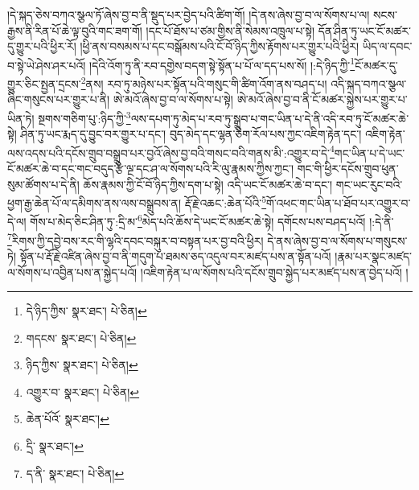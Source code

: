 །དེ་སྐད་ཅེས་བཀའ་སྩལ་ཏོ་ཞེས་བྱ་བ་ནི་སྡུད་པར་བྱེད་པའི་ཚིག་གོ། །དེ་ནས་ཞེས་བྱ་བ་ལ་སོགས་པ་ལ། སངས་རྒྱས་ནི་རིན་པོ་ཆེ་ལྟ་བུའི་གང་ཟག་གོ། །དང་པོ་ཐོས་པ་ཙམ་གྱིས་ནི་སེམས་འཁྲུལ་པ་སྟེ། དོན་ཤིན་ཏུ་ཡང་ངོ་མཚར་དུ་གྱུར་པའི་ཕྱིར་རོ། །ཕྱི་ནས་བསམས་པ་དང་བསྒོམས་པའི་ངོ་བོ་ཉིད་ཀྱིས་རྟོགས་པར་གྱུར་པའི་ཕྱིར། ཡིད་ལ་དབང་བ་སྟེ་ཡེ་ཤེས་ཤར་པའོ། །དེའི་འོག་ཏུ་ནི་རབ་དགྱེས་བདག་སྟེ་སྟོན་པ་པོ་ལ་དད་པས་སོ། །:དེ་ཉིད་ཀྱི་\footnote{དེ་ཉིད་ཀྱིས་  སྣར་ཐང་།  པེ་ཅིན། }ངོ་མཚར་དུ་གྱུར་ཅིང་སྤྱན་དྲངས་\footnote{གདངས་  སྣར་ཐང་།  པེ་ཅིན། }ནས། རབ་ཏུ་མཉེས་པར་སྟོན་པའི་གསུང་གི་ཚིག་འོག་ནས་བཤད་པ། འདི་སྐད་བཀའ་སྩལ་ཞིང་གསུངས་པར་གྱུར་པ་ནི། ཨེ་མའོ་ཞེས་བྱ་བ་ལ་སོགས་པ་སྟེ། ཨེ་མའོ་ཞེས་བྱ་བ་ནི་ངོ་མཚར་སྐྱེས་པར་གྱུར་པ་ཡིན་ཏེ། སྔགས་གཅིག་པུ་:ཉིད་ཀྱི་\footnote{ཉིད་ཀྱིས་  སྣར་ཐང་།  པེ་ཅིན། }ལས་དཔག་ཏུ་མེད་པ་རབ་ཏུ་སྒྲུབ་པ་གང་ཡིན་པ་དེ་ནི་འདི་རབ་ཏུ་ངོ་མཚར་ཆེ་སྟེ། ཤིན་ཏུ་ཡང་རྨད་དུ་བྱུང་བར་གྱུར་པ་དང་། བུད་མེད་དང་ལྷན་ཅིག་རོལ་པས་ཀྱང་འཇིག་རྟེན་དང་། འཇིག་རྟེན་ལས་འདས་པའི་དངོས་གྲུབ་བསྒྲུབ་པར་བྱའོ་ཞེས་བྱ་བའི་གསང་བའི་གནས་མི་:འགྱུར་བ་དེ་\footnote{འགྱུར་བ་  སྣར་ཐང་།  པེ་ཅིན། }གང་ཡིན་པ་དེ་ཡང་ངོ་མཚར་ཆེ་བ་དང་གང་བདུད་རྩི་ལྔ་དང་ཤ་ལ་སོགས་པའི་རི་ལུ་རྣམས་ཀྱིས་ཀྱང་། གང་གི་ཕྱིར་དངོས་གྲུབ་ཕུན་སུམ་ཚོགས་པ་དེ་ནི། ཆོས་རྣམས་ཀྱི་ངོ་བོ་ཉིད་ཀྱིས་དག་པ་སྟེ། འདི་ཡང་ངོ་མཚར་ཆེ་བ་དང་། གང་ཡང་རུང་བའི་ཕྱག་རྒྱ་ཆེན་པོ་ལ་དམིགས་ནས་ལས་བསྒྲུབས་ན། རྡོ་རྗེ་འཆང་:ཆེན་པོའི་\footnote{ཆེན་པོའོ་  སྣར་ཐང་། }གོ་འཕང་གང་ཡིན་པ་ཐོབ་པར་འགྱུར་བ་དེ་ལ། གོས་པ་མེད་ཅིང་ཤིན་ཏུ་:དྲི་མ་\footnote{དྲི་  སྣར་ཐང་། }མེད་པའི་ཆོས་དེ་ཡང་ངོ་མཚར་ཆེ་སྟེ། དགོངས་པས་བཤད་པའོ། །:དེ་ནི་\footnote{ད་ནི་  སྣར་ཐང་།  པེ་ཅིན། }རིགས་ཀྱི་དབྱེ་བས་རང་གི་ལྷའི་དབང་བསྐུར་བ་བསྟན་པར་བྱ་བའི་ཕྱིར། དེ་ནས་ཞེས་བྱ་བ་ལ་སོགས་པ་གསུངས་ཏེ། སྟོན་པ་རྡོ་རྗེ་འཛིན་ཞེས་བྱ་བ་ནི་གདུག་པ་ཐམས་ཅད་འདུལ་བར་མཛད་པས་ན་སྟོན་པའོ། །རྣམ་པར་སྣང་མཛད་ལ་སོགས་པ་འབྱིན་པས་ན་སྐྱེད་པའོ། །འཇིག་རྟེན་པ་ལ་སོགས་པའི་དངོས་གྲུབ་སྐྱེད་པར་མཛད་པས་ན་བྱེད་པའོ། །
